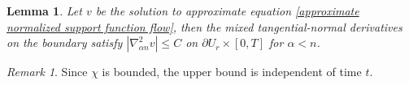 \documentclass[reqno]{amsart}
\newtheorem{lemma}[theorem]{Lemma}
\theoremstyle{remark}
\newtheorem{remark}[theorem]{Remark}
\theoremstyle{definition}
\numberwithin{equation}{section}
\begin{document}
\begin{lemma}
    Let $v$ be the solution to approximate equation \eqref{approximate normalized support function flow}, then the mixed tangential-normal derivatives on the boundary satisfy $|\nabla^2_{\alpha n} v| \leqslant C$ on $\partial U_r \times [0, T]$ for $\alpha < n$.
\end{lemma}
\begin{remark}
    Since $\chi$ is bounded, the upper bound is independent of time $t$.
\end{remark}
\end{document}
